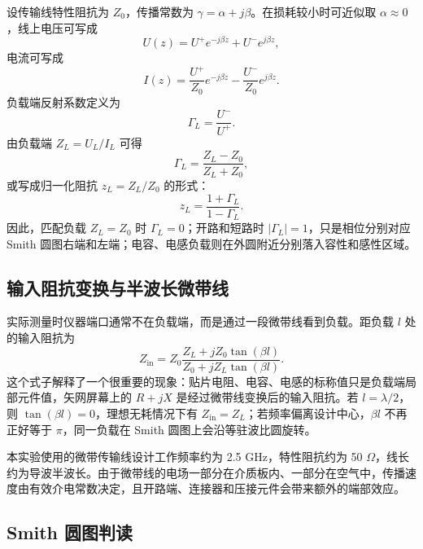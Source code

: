 \documentclass{ctexart}
\newcommand{\Zzero}{Z_0}
\begin{document}
设传输线特性阻抗为 $\Zzero$，传播常数为 $\gamma=\alpha+j\beta$。在损耗较小时可近似取 $\alpha\approx0$，线上电压可写成
\begin{equation}
  U(z)=U^+e^{-j\beta z}+U^-e^{j\beta z},
\end{equation}
电流可写成
\begin{equation}
  I(z)=\frac{U^+}{\Zzero}e^{-j\beta z}
      -\frac{U^-}{\Zzero}e^{j\beta z}.
\end{equation}
负载端反射系数定义为
\begin{equation}
  \Gamma_L=\frac{U^-}{U^+}.
\end{equation}
由负载端 $Z_L=U_L/I_L$ 可得
\begin{equation}
  \Gamma_L=\frac{Z_L-\Zzero}{Z_L+\Zzero},
  \label{eq:gamma-load}
\end{equation}
或写成归一化阻抗 $z_L=Z_L/\Zzero$ 的形式：
\begin{equation}
  z_L=\frac{1+\Gamma_L}{1-\Gamma_L}.
\end{equation}
因此，匹配负载 $Z_L=\Zzero$ 时 $\Gamma_L=0$；开路和短路时 $|\Gamma_L|=1$，只是相位分别对应 Smith 圆图右端和左端；电容、电感负载则在外圆附近分别落入容性和感性区域。

\subsection{输入阻抗变换与半波长微带线}

实际测量时仪器端口通常不在负载端，而是通过一段微带线看到负载。距负载 $l$ 处的输入阻抗为
\begin{equation}
  Z_\mathrm{in}=\Zzero
  \frac{Z_L+j\Zzero\tan(\beta l)}
       {\Zzero+jZ_L\tan(\beta l)}.
  \label{eq:zin}
\end{equation}
这个式子解释了一个很重要的现象：贴片电阻、电容、电感的标称值只是负载端局部元件值，矢网屏幕上的 $R+jX$ 是经过微带线变换后的输入阻抗。若 $l=\lambda/2$，则 $\tan(\beta l)=0$，理想无耗情况下有 $Z_\mathrm{in}=Z_L$；若频率偏离设计中心，$\beta l$ 不再正好等于 $\pi$，同一负载在 Smith 圆图上会沿等驻波比圆旋转。

本实验使用的微带传输线设计工作频率约为 2.5 GHz，特性阻抗约为 50 $\Omega$，线长约为导波半波长。由于微带线的电场一部分在介质板内、一部分在空气中，传播速度由有效介电常数决定，且开路端、连接器和压接元件会带来额外的端部效应。

\subsection{Smith 圆图判读}
\end{document}
